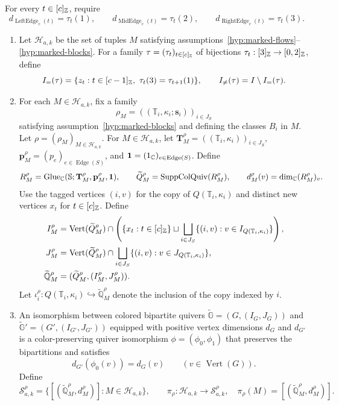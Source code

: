 \begin{definition}
\begin{hypotheses}
\begin{enumerate}[label=(\roman*),font=\itshape]
For every $t\in[c]_{\mathbb Z}$, require
\[
 d_{\operatorname{LeftEdge}_c(t)}=\tau_t(1),\qquad
 d_{\operatorname{MidEdge}_c(t)}=\tau_t(2),\qquad
 d_{\operatorname{RightEdge}_c(t)}=\tau_t(3).
\]
\end{enumerate}
\end{hypotheses}
\begin{enumerate}[font=\itshape]
\item\label{d:marked-chain-set} Let $\mathcal H_{a,k}$ be the set of tuples $M$ satisfying assumptions~\ref{hyp:marked-flows}--\ref{hyp:marked-blocks}.
For a family $\tau=(\tau_t)_{t\in[c]_{\mathbb Z}}$ of bijections $\tau_t:[3]_{\mathbb Z}\to[0,2]_{\mathbb Z}$, define
\[
 I_=(\tau)=\{z_t:t\in[c-1]_{\Z},\ \tau_t(3)=\tau_{t+1}(1)\},\qquad
 I_{\ne}(\tau)=I\setminus I_=(\tau).
\]
\item\label{d:marked-chain-support} For each $M\in\mathcal H_{a,k}$, fix a family
\[
 \rho_M=((\mathbb T_i,\kappa_i;\mathbf s_i))_{i\in J_S}
\]
satisfying assumption~\ref{hyp:marked-blocks} and defining the classes $B_i$ in $M$.
Let $\rho=(\rho_M)_{M\in\mathcal H_{a,k}}$.
For $M\in\mathcal H_{a,k}$, let
$\mathbf T_M^\rho=((\mathbb T_i,\kappa_i))_{i\in J_S}$,
$\mathbf p_M^\rho=(p_e)_{e\in\operatorname{Edge}(S)}$, and
$\mathbf 1=(1_{\mathbb C})_{e\in\operatorname{Edge}(S)}$.
Define
\[
 R_M^\rho=\operatorname{Glue}_{\mathbb C}(\mathbb S;\mathbf T_M^\rho,\mathbf p_M^\rho,\mathbf 1),\qquad
 \widetilde Q_M^\rho=\operatorname{SuppColQuiv}(R_M^\rho),\qquad
 d_M^\rho(v)=\dim_{\mathbb C}(R_M^\rho)_v.
\]
Use the tagged vertices $(i,v)$ for the copy of $Q(\mathbb T_i,\kappa_i)$ and distinct new vertices $x_t$ for $t\in[c]_{\mathbb Z}$.
Define
\[
\begin{aligned}
 I_M^\rho&=\operatorname{Vert}(\widetilde Q_M^\rho)\cap
 \left(\{x_t:t\in[c]_{\mathbb Z}\}\sqcup
 \bigsqcup_{i\in J_S}\{(i,v):v\in I_{Q(\mathbb T_i,\kappa_i)}\}\right),\\
 J_M^\rho&=\operatorname{Vert}(\widetilde Q_M^\rho)\cap
 \bigsqcup_{i\in J_S}\{(i,v):v\in J_{Q(\mathbb T_i,\kappa_i)}\},\\
 \widetilde{\mathbb Q}_M^\rho&=(\widetilde Q_M^\rho,(I_M^\rho,J_M^\rho)).
\end{aligned}
\]
Let $\iota_i^\rho:Q(\mathbb T_i,\kappa_i)\hookrightarrow\widetilde{\mathbb Q}_M^\rho$ denote the inclusion of the copy indexed by $i$.
\item\label{d:dimensioned-support-classes} An isomorphism between colored bipartite quivers $\widetilde{\mathbb G}=(G,(I_G,J_G))$ and $\widetilde{\mathbb G}'=(G',(I_{G'},J_{G'}))$ equipped with positive vertex dimensions $d_G$ and $d_{G'}$ is a color-preserving quiver isomorphism $\phi=(\phi_0,\phi_1)$ that preserves the bipartitions and satisfies
\[
 d_{G'}(\phi_0(v))=d_G(v)\qquad(v\in\operatorname{Vert}(G)).
\]
Define
\[
 \mathcal S_{a,k}^\rho=\{[(\widetilde{\mathbb Q}_M^\rho,d_M^\rho)]:M\in\mathcal H_{a,k}\},\qquad
 \pi_\rho:\mathcal H_{a,k}\longrightarrow\mathcal S_{a,k}^\rho,\quad
 \pi_\rho(M)=[(\widetilde{\mathbb Q}_M^\rho,d_M^\rho)].
\]


\end{enumerate}
\end{definition}
